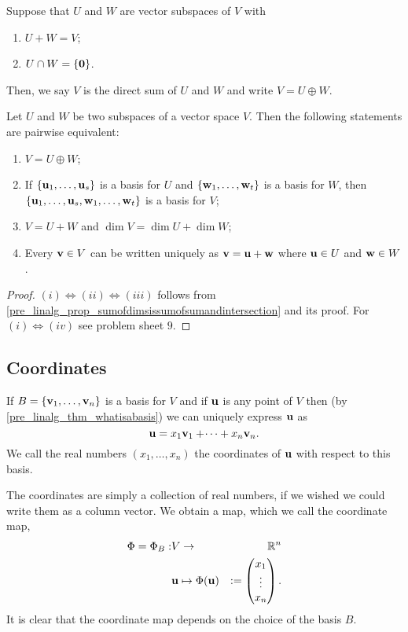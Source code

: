 \documentclass[10pt, a4paper]{article}
\begin{document}
\begin{definition}
    Suppose that $U$ and $W$ are vector subspaces of $V$ with
    \begin{enumerate}[label = (\roman*)]
        \item $U + W = V$;
        \item $U \cap W = \{\mathbf{0}\}$.
    \end{enumerate}
    Then,
    we say $V$ is the direct sum of $U$ and $W$ and write $V = U \oplus W$.
\end{definition}

\begin{proposition}
    Let $U$ and $W$ be two subspaces of a vector space $V$.
    Then the following statements are pairwise equivalent:
    \begin{enumerate}[label = (\roman*)]
        \item $V = U \oplus W$;
        \item If $\{\mathbf{u}_1, \dotsc, \mathbf{u}_s\}$ is a basis for $U$ and $\{\mathbf{w}_1, \dotsc, \mathbf{w}_t\}$ is a basis for $W$,
        then $\{\mathbf{u}_1, \dotsc, \mathbf{u}_s, \mathbf{w}_1, \dotsc, \mathbf{w}_t\}$ is a basis for $V$;
        \item $V = U + W$ and $\dim{V} = \dim{U} + \dim{W}$;
        \item Every $\mathbf{v} \in V$ can be written uniquely as $\mathbf{v} = \mathbf{u} + \mathbf{w}$ where $\mathbf{u} \in U$ and $\mathbf{w} \in W$.
    \end{enumerate}
    \begin{proof}
        $(i) \iff (ii) \iff (iii)$ follows from \autoref{pre_linalg_prop_sumofdimsissumofsumandintersection} and its proof.
        For $(i) \iff (iv)$ see problem sheet $9$.
    \end{proof}
\end{proposition}

\subsection{Coordinates}
If $B = \{\mathbf{v}_1, \dotsc, \mathbf{v}_n\}$ is a basis for $V$ and if $\mathbf{u}$ is any point of $V$ then
(by \autoref{pre_linalg_thm_whatisabasis})
we can uniquely express $\mathbf{u}$ as
\[
\mathbf{u} = x_1\mathbf{v}_1 + \dotsi + x_n\mathbf{v}_n.
\]
We call the real numbers $(x_1, \dotsc, x_n)$ the coordinates of $\mathbf{u}$ with respect to this basis.

The coordinates are simply a collection of real numbers,
if we wished we could write them as a column vector.
We obtain a map,
which we call the coordinate map,
\begin{align*}
    \Phi = \Phi_B : &V \rightarrow &\mathbb{R} ^ n \\
    &\mathbf{u} \mapsto \Phi(\mathbf{u}) &:=\begin{pmatrix}
        x_1 \\ \vdots \\ x_n
    \end{pmatrix}.
\end{align*}
It is clear that the coordinate map depends on the choice of the basis $B$.
\end{document}
